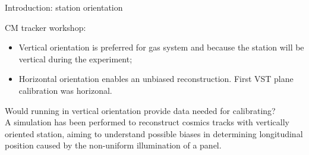 \documentclass{beamer}[10pt]
\begin{document}
\begin{frame}{Introduction: station orientation}
  
  CM tracker workshop:
  \vspace{1mm}
  \begin{itemize}
    \item Vertical orientation is preferred for gas system and because the station will be vertical during the experiment;
    \vspace{1mm}
  \item Horizontal orientation enables an unbiased reconstruction. First VST plane calibration was horizonal.
\end{itemize}
\vspace{3mm}
Would running in vertical orientation provide data needed for calibrating?
\vspace{3mm}
\\
A simulation has been performed to reconstruct cosmics tracks with vertically oriented station,
  aiming to understand possible biases in determining longitudinal position caused by the non-uniform illumination of a panel.
\end{frame}
\end{document}
